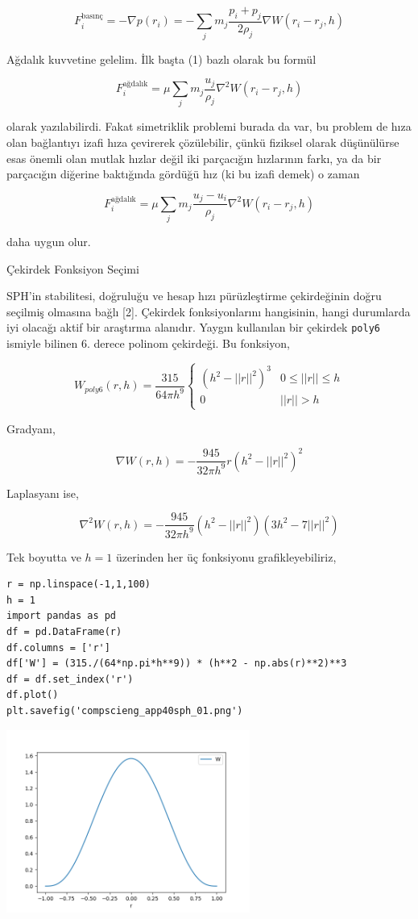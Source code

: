 \documentclass[12pt,fleqn]{article}\usepackage{../../common}
\begin{document}
$$
F_i^{\textrm{basınç}} = - \nabla p(r_i) =
- \sum_j m_j \frac{p_i + p_j}{2 \rho_j} \nabla W(r_i-r_j,h)
$$

Ağdalık kuvvetine gelelim. İlk başta (1) bazlı olarak bu formül

$$
F_i^{\textrm{ağdalık}} = \mu \sum_j m_j \frac{u_j}{\rho_j} \nabla^2 W (r_i-r_j, h)
$$

olarak yazılabilirdi. Fakat simetriklik problemi burada da var, bu problem de
hıza olan bağlantıyı izafi hıza çevirerek çözülebilir, çünkü fiziksel olarak
düşünülürse esas önemli olan mutlak hızlar değil iki parçacığın hızlarının
farkı, ya da bir parçacığın diğerine baktığında gördüğü hız (ki bu izafi demek)
o zaman

$$
F_i^{\textrm{ağdalık}} = \mu \sum_j m_j \frac{u_j-u_i}{\rho_j} \nabla^2 W (r_i-r_j, h)
$$

daha uygun olur.

Çekirdek Fonksiyon Seçimi

SPH'in stabilitesi, doğruluğu ve hesap hızı pürüzleştirme çekirdeğinin doğru
seçilmiş olmasına bağlı [2]. Çekirdek fonksiyonlarını hangisinin, hangi
durumlarda iyi olacağı aktif bir araştırma alanıdır. Yaygın kullanılan bir
çekirdek \verb!poly6! ismiyle bilinen 6. derece polinom çekirdeği. Bu fonksiyon,

$$
W_{poly6} (r, h) = \frac{315}{64 \pi h^9}
\left\{ \begin{array}{ll}
(h^2 - ||r||^2)^3 & 0 \le ||r|| \le h \\
0 & ||r|| > h
\end{array} \right.
$$

Gradyanı,

$$
\nabla W (r, h) =
- \frac{945}{32 \pi h^9} r ( h^2 - ||r||^2)^2
$$

Laplasyanı ise,

$$
\nabla^2 W (r, h) =
- \frac{945}{32\pi h^9} (h^2 - ||r||^2)(3 h^2 - 7||r||^2)
$$

Tek boyutta ve $h=1$ üzerinden her üç fonksiyonu grafikleyebiliriz,

\begin{verbatim}
r = np.linspace(-1,1,100)
h = 1
import pandas as pd
df = pd.DataFrame(r)
df.columns = ['r']
df['W'] = (315./(64*np.pi*h**9)) * (h**2 - np.abs(r)**2)**3
df = df.set_index('r')
df.plot()
plt.savefig('compscieng_app40sph_01.png')
\end{verbatim}

\includegraphics[height=6cm]{compscieng_app40sph_01.png}
\end{document}
